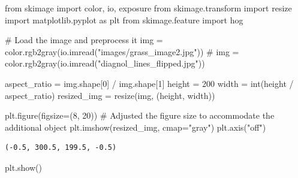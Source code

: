 \documentclass[
  letterpaper,
  DIV=11,
  numbers=noendperiod]{scrreprt}
\newenvironment{Shaded}{\begin{snugshade}}{\end{snugshade}}
\newcommand{\BuiltInTok}[1]{\textcolor[rgb]{0.00,0.23,0.31}{#1}}
\newcommand{\CommentTok}[1]{\textcolor[rgb]{0.37,0.37,0.37}{#1}}
\newcommand{\DecValTok}[1]{\textcolor[rgb]{0.68,0.00,0.00}{#1}}
\newcommand{\ImportTok}[1]{\textcolor[rgb]{0.00,0.46,0.62}{#1}}
\newcommand{\NormalTok}[1]{\textcolor[rgb]{0.00,0.23,0.31}{#1}}
\newcommand{\OperatorTok}[1]{\textcolor[rgb]{0.37,0.37,0.37}{#1}}
\newcommand{\StringTok}[1]{\textcolor[rgb]{0.13,0.47,0.30}{#1}}
\begin{document}
\begin{Shaded}
\begin{Highlighting}[]
\ImportTok{from}\NormalTok{ skimage }\ImportTok{import}\NormalTok{ color, io, exposure}
\ImportTok{from}\NormalTok{ skimage.transform }\ImportTok{import}\NormalTok{ resize}
\ImportTok{import}\NormalTok{ matplotlib.pyplot }\ImportTok{as}\NormalTok{ plt}
\ImportTok{from}\NormalTok{ skimage.feature }\ImportTok{import}\NormalTok{ hog}

\CommentTok{\# Load the image and preprocess it}
\NormalTok{img }\OperatorTok{=}\NormalTok{ color.rgb2gray(io.imread(}\StringTok{"images/grass\_image2.jpg"}\NormalTok{))}
\CommentTok{\# img = color.rgb2gray(io.imread("diagnol\_lines\_flipped.jpg"))}

\NormalTok{aspect\_ratio }\OperatorTok{=}\NormalTok{ img.shape[}\DecValTok{0}\NormalTok{] }\OperatorTok{/}\NormalTok{ img.shape[}\DecValTok{1}\NormalTok{]}
\NormalTok{height }\OperatorTok{=} \DecValTok{200}
\NormalTok{width }\OperatorTok{=} \BuiltInTok{int}\NormalTok{(height }\OperatorTok{/}\NormalTok{ aspect\_ratio)}
\NormalTok{resized\_img }\OperatorTok{=}\NormalTok{ resize(img, (height, width))}

\NormalTok{plt.figure(figsize}\OperatorTok{=}\NormalTok{(}\DecValTok{8}\NormalTok{, }\DecValTok{20}\NormalTok{))  }\CommentTok{\# Adjusted the figure size to accommodate the additional object}
\NormalTok{plt.imshow(resized\_img, cmap}\OperatorTok{=}\StringTok{"gray"}\NormalTok{)}
\NormalTok{plt.axis(}\StringTok{"off"}\NormalTok{)}
\end{Highlighting}
\end{Shaded}

\begin{verbatim}
(-0.5, 300.5, 199.5, -0.5)
\end{verbatim}

\begin{Shaded}
\begin{Highlighting}[]
\NormalTok{plt.show()}
\end{Highlighting}
\end{Shaded}
\end{document}
